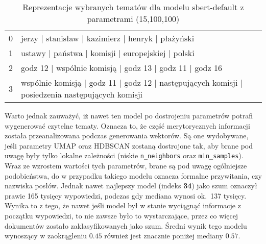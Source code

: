 	\begin{table}[htb]
		\caption{Reprezentacje wybranych tematów dla modelu sbert-default z parametrami (15,100,100)}\label{tab:sbert_default_topics} %
		\centering
		\small
		\begin{tabularx}{\textwidth}{rl}
			\toprule
			0 & jerzy | stanisław | kazimierz | henryk | płażyński \\
			1 & ustawy | państwa | komisji | europejskiej | polski \\
			2 & godz 12 | wspólnie komisją | godz 13 | godz 11 | godz 16 \\
			3 & wspólnie komisją | godz 11 | godz 12 | następujących komisji | posiedzenia następujących komisji \\
			\bottomrule
		\end{tabularx}
	\end{table}

	Warto jednak zauważyć, iż nawet ten model po dostrojeniu parametrów potrafi wygenerować czytelne tematy.
	Oznacza to, że część merytorycznych informacji została przeanalizowana podczas generowania wektorów.
	Są one wydobywane, jeśli parametry UMAP oraz HDBSCAN zostaną dostrojone tak,
		aby brane pod uwagę były tylko lokalne zależności (niskie \verb|n_neighbors| oraz \verb|min_samples|).
	Wraz ze wzrostem wartości tych parametrów, brane są pod uwagę ogólniejsze podobieństwa,
		do w przypadku takiego modelu oznacza formalne przywitania, czy nazwiska posłów.
	Jednak nawet najlepszy model (indeks \textbf{34}) jako szum oznaczył prawie 165 tysięcy wypowiedzi, podczas gdy mediana wynosi ok.~137 tysięcy.
	Wynika to z tego, że nawet jeśli model był w stanie wyciągnąć informacje z początku wypowiedzi, to nie zawsze było to wystarczające, przez co więcej dokumentów zostało zaklasyfikowanych jako szum.
	Średni wynik tego modelu wynoszący w zaokrągleniu \(0.45\) również jest znacznie poniżej mediany \(0.57\).
